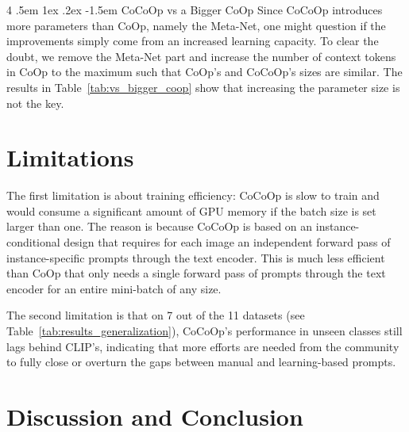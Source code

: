 \documentclass[10pt,twocolumn,letterpaper]{article}
\makeatletter
\renewcommand\paragraph{
  \@startsection{paragraph} %
  {4} %
  {\z@} %
  {.5em \@plus1ex \@minus.2ex} %
  {-1.5em} %
  {\normalfont\normalsize\bfseries} %
}
\makeatother
\begin{document}
\paragraph{CoCoOp vs a Bigger CoOp}
Since CoCoOp introduces more parameters than CoOp, namely the Meta-Net, one might question if the improvements simply come from an increased learning capacity. To clear the doubt, we remove the Meta-Net part and increase the number of context tokens in CoOp to the maximum such that CoOp's and CoCoOp's sizes are similar. The results in Table~\ref{tab:vs_bigger_coop} show that increasing the parameter size is not the key.

\section{Limitations}
\label{sec:limitations}

The first limitation is about training efficiency: CoCoOp is slow to train and would consume a significant amount of GPU memory if the batch size is set larger than one. The reason is because CoCoOp is based on an instance-conditional design that requires for each image an independent forward pass of instance-specific prompts through the text encoder. This is much less efficient than CoOp that only needs a single forward pass of prompts through the text encoder for an entire mini-batch of any size.

The second limitation is that on 7 out of the 11 datasets (see Table~\ref{tab:results_generalization}), CoCoOp's performance in unseen classes still lags behind CLIP's, indicating that more efforts are needed from the community to fully close or overturn the gaps between manual and learning-based prompts.



\section{Discussion and Conclusion}
\label{sec:conclusion}
\end{document}
